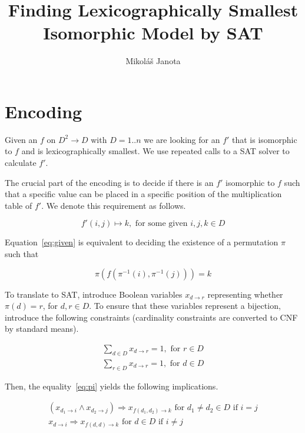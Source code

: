 \documentclass[11pt]{article}
\title{Finding Lexicographically Smallest Isomorphic Model by SAT}
\author{Mikol\'a\v{s} Janota}
\newcommand{\xpi}[2]{x_{{#1}\rightarrow{#2}}}
\begin{document}
\maketitle

\section{Encoding}

Given an $f$ on $D^2\rightarrow D$ with $D=1..n$ we are looking for an $f'$ that is
isomorphic to $f$ and is lexicographically smallest. We use repeated calls
to a SAT solver to calculate $f'$.

The crucial part of the encoding is to decide if there is an $f'$ isomorphic to
$f$ such that a specific value can be placed in a specific position of the
multiplication table of $f'$. We denote this requirement as follows.

\begin{equation}\label{eq:given}
  f'(i,j)\mapsto k, \text{ for some  given } i,j,k\in D
\end{equation}

Equation~\eqref{eq:given}  is equivalent to deciding the existence of a permutation $\pi$ such that

\begin{equation}\label{eq:pi}
  \pi\left(f(\pi^{-1}(i),\pi^{-1}(j))\right) = k
\end{equation}

To translate to SAT, introduce Boolean variables $\xpi{d}{r}$ representing
whether $\pi(d)=r$, for $d,r\in D$. To ensure that these variables represent a
bijection, introduce the following constraints (cardinality constraints are
converted to CNF by standard means).

\begin{align}
  \sum_{d\in D} \xpi{d}{r}=1, \text{ for } r\in D\\
  \sum_{r\in D} \xpi{d}{r}=1, \text{ for } d\in D
\end{align}

Then, the equality~\eqref{eq:pi} yields the following implications.

\begin{align}
  \left(\xpi{d_1}{i}\land\xpi{d_2}{j}\right)\Rightarrow\xpi{f(d_1, d_2)}{k}\text{ for } d_1\neq d_2\in D
  \text{ if } i=j\\
  \xpi{d}{i}\Rightarrow\xpi{f(d, d)}{k}\text{ for } d\in D \text{ if } i\neq j
\end{align}
\end{document}
